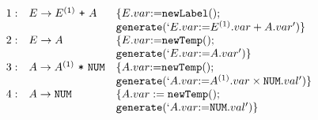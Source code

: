 \documentclass[dvipdfmx]{jarticle}
\begin{document}
\[
\begin{array}{lll}
1:& E\rightarrow E^{(1)}\ \texttt{+}\ A & \{E.var\mbox{:=}{\tt newLabel()};\\
  &                                & {\tt generate(`}{E.var}{\tt :=}{E^{(1)}.var+A.var}{\tt ')}\}\\
2:& E\rightarrow A                 & \{E.var\mbox{:=}{\tt newTemp()};\\
  &                                & {\tt generate(`}{E.var}{\tt :=}{A.var}{\tt ')}\}\\
3:& A\rightarrow A^{(1)}\ \texttt{*}\ \texttt{NUM} & \{A.var\mbox{:=}{\tt newTemp()};\\
  &                                     & {\tt generate(`}{A.var}{\tt :=}{A^{(1)}.var\times\texttt{NUM}.val}{\tt ')}\}\\
4:& A\rightarrow \texttt{NUM} & \{A.var:={\tt newTemp()};\\
  &                     & {\tt generate(`}{A.var}{\tt :=}{\texttt{NUM}.val}{\tt ')}\}
\end{array}
\]
\end{document}

